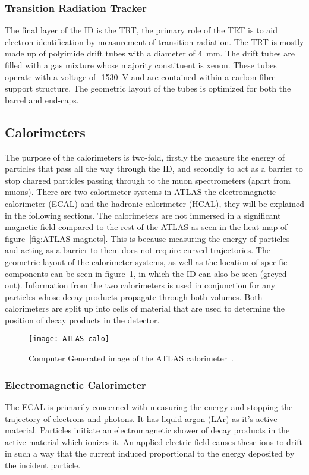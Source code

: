 \subsubsection{Transition Radiation Tracker}

The final layer of the ID is the TRT, the primary role of the TRT is to aid
electron identification by measurement of transition radiation. The TRT is
mostly made up of polyimide drift tubes with a diameter of 4~mm. The drift tubes
are filled with a gas mixture whose majority constituent is xenon. These tubes
operate with a voltage of -1530~V and are contained within a carbon fibre
support structure. The geometric layout of the tubes is optimized for
both the barrel and end-caps.



\subsection{Calorimeters}%
\label{sec:calo}

The purpose of the calorimeters is two-fold, firstly the measure the energy of
particles that pass all the way through the ID, and secondly to act as a barrier
to stop charged particles passing through to the muon spectrometers (apart from
muons). There are two calorimeter systems in ATLAS the electromagnetic
calorimeter (ECAL) and the hadronic calorimeter (HCAL), they will be explained
in the following sections. The calorimeters are not immersed in a significant magnetic
field compared to the rest of the ATLAS as seen in the heat map of
figure~\ref{fig:ATLAS-magnets}. This is because measuring the energy of
particles and acting as a barrier to them does not require curved trajectories.
The geometric layout of the calorimeter systems, as well as the location of
specific components can be seen in figure~\ref{fig:ATLAS-calo}, in which the ID
can also be seen (greyed out). Information from the two calorimeters is used in
conjunction for any particles whose decay products propagate through both
volumes. Both calorimeters are split up into cells of material that are used to
determine the position of decay products in the detector.
\begin{figure}[h]
  \centering
  \texttt{[image: ATLAS-calo]}
  \caption{Computer Generated image of the ATLAS
    calorimeter~\cite{ATLAS-calo-fig}.}%
  \label{fig:ATLAS-calo}
\end{figure}

\subsubsection{Electromagnetic Calorimeter}
The ECAL is primarily concerned with measuring the energy and stopping the
trajectory of electrons and photons. It has liquid argon (LAr) as it's active
material. Particles initiate an electromagnetic shower of decay products in the
active material which ionizes it. An applied electric field causes these ions to
drift in such a way that the current induced proportional to the energy
deposited by the incident particle.

